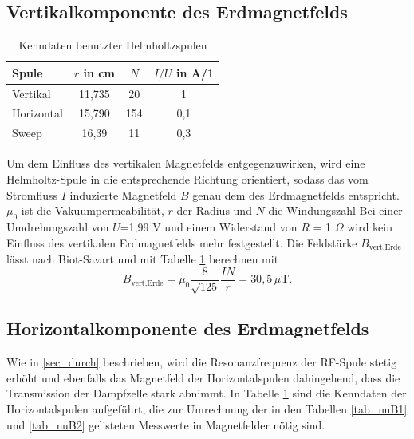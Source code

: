 \subsection{Vertikalkomponente des Erdmagnetfelds}
\begin{table}[H]
 \begin{tabular}{l|c|c|c}
  Spule & $r$ in cm & $N$ & $I/U$ in A/1\\
  \hline
  Vertikal & 11,735 & 20 & 1\\
  Horizontal & 15,790 & 154 & 0,1\\
  Sweep & 16,39 & 11 & 0,3
 \end{tabular}
\caption{Kenndaten benutzter Helmholtzspulen}
\label{tab_SpulenHor}
\end{table}
Um dem Einfluss des vertikalen Magnetfelds entgegenzuwirken, wird eine Helmholtz-Spule in die entsprechende Richtung orientiert, sodass das vom 
Stromfluss $I$ induzierte Magnetfeld $B$ genau dem des Erdmagnetfelds entspricht. $\mu_0$ ist die Vakuumpermeabilität, $r$ der Radius und $N$ die Windungszahl
Bei einer Umdrehungszahl von $U$=1,99 V und einem Widerstand von $R$ = 1 $\Omega$ wird kein Einfluss des vertikalen Erdmagnetfelds mehr festgestellt. 
Die Feldstärke $B_{\text{vert,Erde}}$ lässt nach Biot-Savart und mit Tabelle \ref{tab_SpulenHor} berechnen mit
\begin{equation}
 B_{\text{vert,Erde}} = \mu_0 \frac{8}{\sqrt{125}}\frac{I N}{r} = 30,5 \, \mu\text{T}.
\end{equation}
\subsection{Horizontalkomponente des Erdmagnetfelds}
Wie in \ref{sec_durch} beschrieben, wird die Resonanzfrequenz der RF-Spule stetig erhöht und ebenfalls das Magnetfeld der Horizontalspulen dahingehend,
dass die Transmission der Dampfzelle stark abnimmt. In Tabelle \ref{tab_SpulenHor} sind die Kenndaten der Horizontalspulen aufgeführt, die zur Umrechnung
der in den Tabellen \ref{tab_nuB1} und \ref{tab_nuB2} gelisteten Messwerte in Magnetfelder nötig sind.


